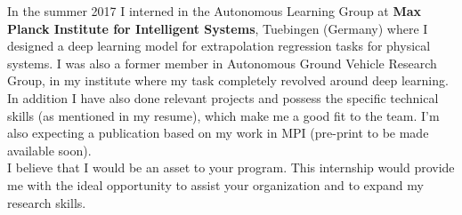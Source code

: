 \tab In the summer 2017 I interned in the Autonomous Learning Group at \textbf{Max Planck Institute for Intelligent Systems}, Tuebingen (Germany) where I designed a deep learning model for extrapolation regression tasks for physical systems. I was also a former member in Autonomous Ground Vehicle Research Group, in my institute where my task completely revolved around deep learning. In addition I have also done relevant projects and possess the specific technical skills (as mentioned in my resume), which make me a good fit to the team. I'm also expecting a publication based on my work in MPI (pre-print to be made available soon).\\

\tab I believe that I would be an asset to your program. This internship would provide me with the ideal opportunity to assist your organization and to expand my research skills.


